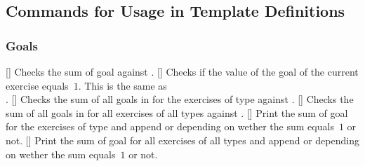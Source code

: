 \documentclass{xsim-manual}
\begin{document}
\subsection{Commands for Usage in Template Definitions}
\subsubsection{Goals}
\begin{commands}
  []
    Checks the sum of goal  against .
  []
    Checks if the value of the goal  of the current exercise
    equals~$1$.  This is the same as \\
    .
  []
    Checks the sum of all goals in  for the exercises of
    type  against .
  []
    Checks the sum of all goals in  for all exercises of
    all types against .
  []
    Print the sum of goal  for the exercises of type 
    and append  or  depending on wether the sum
    equals~$1$ or not.
  []
    Print the sum of goal  for all exercises of all types
    and append  or  depending on wether the sum
    equals~$1$ or not.
\end{commands}
\end{document}

